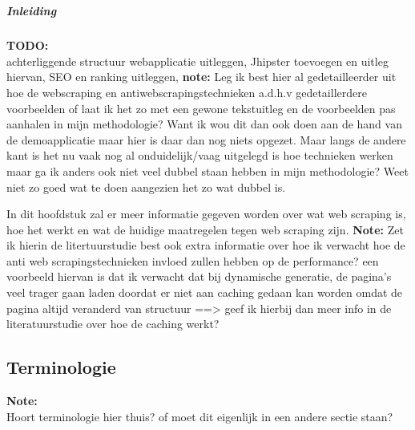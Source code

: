 \chapter{}%
\label{ch:stand-van-zaken}


\paragraph{Inleiding}

\textbf{TODO:}
\\ 
achterliggende structuur webapplicatie uitleggen, Jhipster toevoegen en uitleg hiervan, SEO en ranking uitleggen, \textbf{note:} Leg ik best hier al gedetailleerder uit hoe de webscraping en antiwebscrapingstechnieken a.d.h.v gedetaillerdere voorbeelden of laat ik het zo met een gewone tekstuitleg en de voorbeelden pas aanhalen in mijn methodologie? Want ik wou dit dan ook doen aan de hand van de demoapplicatie maar hier is daar dan nog niets opgezet. Maar langs de andere kant is het nu vaak nog al onduidelijk/vaag uitgelegd is hoe technieken werken maar ga ik anders ook niet veel dubbel staan hebben in mijn methodologie? Weet niet zo goed wat te doen aangezien het zo wat dubbel is.

In dit hoofdstuk zal er meer informatie gegeven worden over wat web scraping is, hoe het werkt en wat de huidige maatregelen tegen web scraping zijn. 
\textbf{Note:} Zet ik hierin de litertuurstudie best ook extra informatie over hoe ik verwacht hoe de anti web scrapingstechnieken invloed zullen hebben op de performance? een voorbeeld hiervan is dat ik verwacht dat bij dynamische generatie, de pagina's veel trager gaan laden doordat er niet aan caching gedaan kan worden omdat de pagina altijd veranderd van structuur ==> geef ik hierbij dan meer info in de literatuurstudie over hoe de caching werkt?  

\section{Terminologie}

\textbf{Note:}
\\ Hoort terminologie hier thuis? of moet dit eigenlijk in een andere sectie staan?

